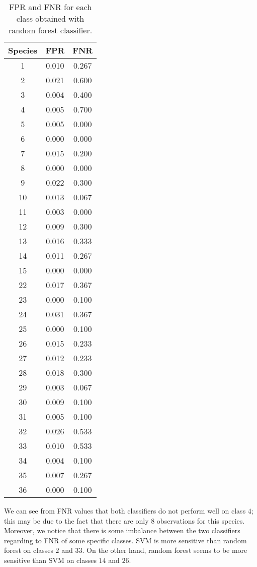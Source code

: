 \documentclass{article}
\begin{document}
\begin{table}
\begin{minipage}[t]{5cm}
\begin{tabular}{ |c|c|c| } \hline
Species & FPR & FNR \\
\hline
1 & 0.010 & 0.267 \\ 
\hline
2 & 0.021 & 0.600 \\ 
\hline
 3 & 0.004 & 0.400 \\ 
\hline
 4 & 0.005 & 0.700 \\ 
\hline
 5 &  0.005 & 0.000 \\ 
\hline
 6 & 0.000 & 0.000 \\ 
\hline
 7 & 0.015 & 0.200 \\ 
\hline
 8 & 0.000 & 0.000 \\ 
\hline
 9 & 0.022 & 0.300 \\ 
\hline
 10 & 0.013 & 0.067 \\ 
\hline
 11 & 0.003 & 0.000 \\ 
\hline
 12 & 0.009 & 0.300 \\ 
\hline
 13 & 0.016 & 0.333 \\ 
\hline
 14 & 0.011 & 0.267 \\ 
\hline
 15 & 0.000 & 0.000 \\ 
\hline
 22 & 0.017 & 0.367 \\ 
\hline
 23 & 0.000 & 0.100 \\ 
\hline
 24 & 0.031 & 0.367 \\ 
\hline
 25 & 0.000 & 0.100 \\ 
\hline
 26 & 0.015 & 0.233 \\ 
\hline
 27 & 0.012 & 0.233 \\ 
\hline
 28 & 0.018 & 0.300 \\ 
\hline
 29 & 0.003 & 0.067 \\ 
\hline
 30 & 0.009& 0.100 \\ 
\hline
 31 &  0.005 & 0.100 \\ 
\hline
 32 & 0.026 & 0.533 \\ 
\hline
 33 & 0.010 & 0.533 \\ 
\hline
 34 & 0.004 & 0.100 \\ 
\hline
 35 & 0.007 & 0.267 \\ 
\hline
 36 & 0.000 & 0.100 \\ 
\hline
\end{tabular}
\caption{FPR and FNR for each class obtained with random forest classifier.}
\end{minipage}
\end{table}

We can see from FNR values that both classifiers do not perform well on class $4$; this may be due to the fact that there are only $8$ observations for this species.
\\Moreover, we notice that there is some imbalance between the two classifiers regarding to FNR of some specific classes. SVM is more sensitive than random forest on classes $2$ and $33$. On the other hand, random forest seems to be more sensitive than SVM on classes $14$ and $26$.




\newpage


\end{document}
